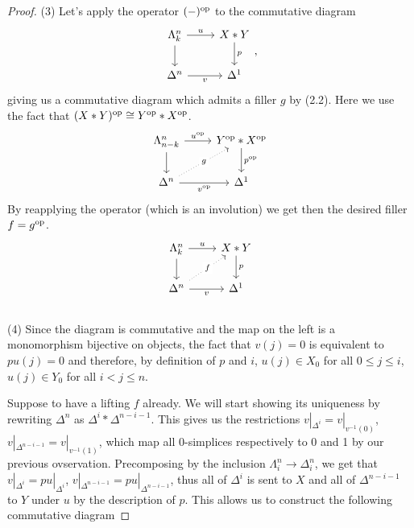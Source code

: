 \documentclass[a4paper,11pt,openany]{scrartcl}
\begin{document}
\begin{proof}
    (3) Let's apply the operator $(-)^{\operatorname{op}}$ to the commutative diagram
    \[\begin{tikzcd}
	{\Lambda^n_k} & {X*Y} \\
	{\Delta^n} & {\Delta^1}
	\arrow["{u}", from=1-1, to=1-2]
	\arrow["{v}"', from=2-1, to=2-2]
	\arrow[from=1-1, to=2-1]
	\arrow["{p}", from=1-2, to=2-2]
    \end{tikzcd},\]
    giving us a commutative diagram which admits a filler $g$ by (2.2). Here we
    use the fact that $(X*Y)^{\operatorname{op}}\cong Y^{\operatorname{op}}*X^{\operatorname{op}}$.
    \[\begin{tikzcd}
	{\Lambda^n_{n-k}} & {Y^{\op}*X^{\op}} \\
	{\Delta^n} & {\Delta^1}
	\arrow["{u^{\op}}", from=1-1, to=1-2]
	\arrow["{v^{\op}}"', from=2-1, to=2-2]
	\arrow[from=1-1, to=2-1]
	\arrow["{p^{\op}}", from=1-2, to=2-2]
	\arrow["{g}" description, from=2-1, to=1-2, dotted]
    \end{tikzcd}\]
    By reapplying the operator (which is an involution) we get then the desired
    filler $f=g^{\operatorname{op}}$.
    \[\begin{tikzcd}
	{\Lambda^n_k} & {X*Y} \\
	{\Delta^n} & {\Delta^1}
	\arrow["{u}", from=1-1, to=1-2]
	\arrow["{v}"', from=2-1, to=2-2]
	\arrow[from=1-1, to=2-1]
	\arrow["{p}", from=1-2, to=2-2]
	\arrow["{f}" description, from=2-1, to=1-2, dotted]
    \end{tikzcd}\] \\

    (4) Since the diagram is commutative and the map on the left is a
    monomorphism bijective on objects, the fact that $v(j)=0$ is equivalent
    to $pu(j)=0$ and therefore, by definition of $p$ and $i$, $u(j)\in X_0$ for
    all $0\leq j\leq i$, $u(j)\in Y_0$ for all $i<j\leq n$.

    Suppose to have a lifting $f$ already. We will start showing its uniqueness
    by rewriting $\Delta^n$ as $\Delta^i*\Delta^{n-i-1}$. This gives us the
    restrictions $v|_{\Delta^i}=v|_{v^{-1}(0)}$,
    $v|_{\Delta^{n-i-1}}=v|_{v^{-1}(1)}$, which map all 0-simplices respectively
    to 0 and 1 by our previous ovservation. Precomposing by the inclusion
    $\Lambda^n_i\rightarrow\Delta^n_i$, we get that $v|_{\Delta^i}=pu|_{\Delta^i}$,
    $v|_{\Delta^{n-i-1}}=pu|_{\Delta^{n-i-1}}$, thus all of $\Delta^i$ is sent
    to $X$ and all of $\Delta^{n-i-1}$ to $Y$ under $u$ by the description of
    $p$. This allows us to construct the following commutative diagram


\end{proof}
\end{document}
